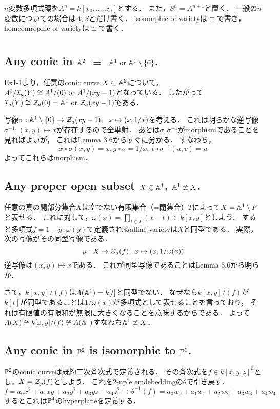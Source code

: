\documentclass[a4paper]{jarticle}
\newcommand{\mor}{\mbox{ or }}
\begin{document}
    $n$変数多項式環を$A^n=k[x_0, \dots, x_n]$とする．
    また，$S^n=A^{n+1}$と置く．
    一般の$n$変数についての場合は$A, S$とだけ書く．
    isomorphic of varietyは$\equiv$で書き，homeomrophic of varietyは$\cong$で書く．

\section{} %
    \subsection{Any conic in $\mathbb{A}^2$ $\equiv$ $\affine^1 \mor \affine^1 \setminus \{0\}$.}
    Ex1-1より，任意のconic curve $X \subset \mathbb{A}^2$について，
    $A^2/\defsa(Y) \cong A^1/(0) \mor A^1/(xy-1)$となっている．
    したがって$\defsa(Y) \cong \zerosa(0)=\affine^1 \mor \zerosa(xy-1)$である．

    写像$\sigma: \mathbb{A}^1 \setminus \{0\} \to \mathcal{Z}_a(xy-1);~~ x \mapsto (x,1/x)$を考える．
    これは明らかな逆写像$\sigma^{-1}: (x,y) \mapsto x$が存在するので全単射．
    あとは$\sigma, \sigma^{-1}$がmorphismであることを見ればよいが，
    これはLemma 3.6からすぐに分かる．
    すなわち，
    \[ \bar{x} \circ \sigma(x,y)=x, \bar{y} \circ \sigma=1/x;~ t \circ \sigma^{-1}(u,v)=u  \]
    よってこれらはmorphism．

    \subsection{Any proper open subset $X \subsetneq \mathbb{A}^1$, $\mathbb{A}^1 \not \equiv X$.}
    任意の真の開部分集合$X$は空でない有限集合（=閉集合）$T$によって$X=\mathbb{A}^1 \setminus F$と表せる．
    これに対して，$\omega(x)=\prod_{t \in T}(x-t) \in k[x,y]$としよう．
    すると多項式$f=1-y \cdot \omega(y)$で定義されるaffine varietyは$X$と同型である．
    実際，次の写像がその同型写像である．
    \[ \mu: X \to \mathcal{Z}_a(f);~ x \mapsto (x, 1/\omega(x)) \]
    逆写像は$(x,y) \mapsto x$である．
    これが同型写像であることはLemma 3.6から明らか．

    さて，$k[x,y]/(f)$は$A(\mathbb{A}^1)=k[t]$と同型でない．
    なぜなら$k[x,y]/(f)$が$k[t]$が同型であることは$1/\omega(x)$が多項式として表せることを言っており，
    それは有限値の有限和が無限に大きくなることを意味するからである．
    よって$A(X) \cong k[x,y]/(f) \not \cong A(\mathbb{A}^1)$すなわち$\mathbb{A}^1 \not \equiv X$．

    \subsection{Any conic in $\mathbb{P}^2$ is isomorphic to $\mathbb{P}^1$.}
    $\mathbb{P}^2$のconic curveは既約二次斉次式で定義される．
    その斉次式を$f \in k[x,y,z]^h$とし，$X=\mathcal{Z}_p(f)$としよう．
    これを2-uple emdebeddingの$\theta$で引き戻す．
    \[ f=a_0 x^2+a_1 xy+a_2 y^2+a_3 yz+a_4 z^2 \mapsto \theta^{-1}(f)=a_0 w_0+a_1 w_1+a_2 w_2+a_3 w_3+a_4 w_4 \]
    するとこれは$\mathbb{P}^4$のhyperplaneを定義する．
\end{document}
